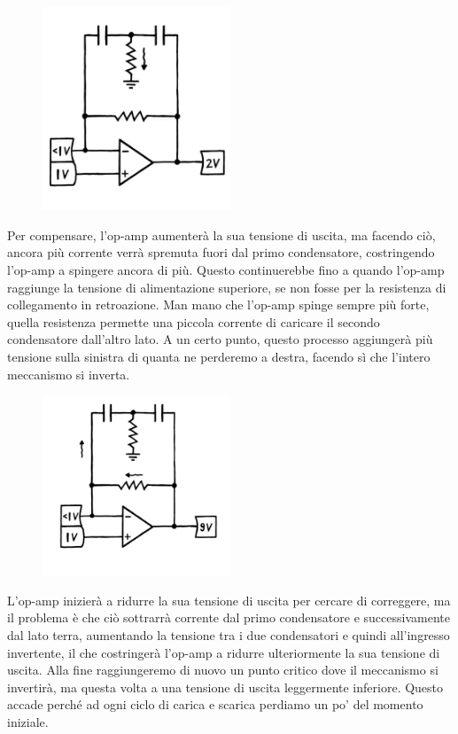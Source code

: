 \documentclass{article}
\begin{document}
\begin{figure}[ht]
    \centering
    \includegraphics[width=0.5\textwidth]{Toscillator2.png} 
    \label{fig:Toscillator2}
\end{figure}

Per compensare, l'op-amp aumenterà la sua tensione di uscita, ma facendo ciò, ancora più corrente verrà spremuta fuori dal primo condensatore, costringendo l'op-amp a spingere ancora di più.
Questo continuerebbe fino a quando l'op-amp raggiunge la tensione di alimentazione superiore, se non fosse per la resistenza di collegamento in retroazione.
Man mano che l'op-amp spinge sempre più forte, quella resistenza permette una piccola corrente di caricare il secondo condensatore dall'altro lato.
A un certo punto, questo processo aggiungerà più tensione sulla sinistra di quanta ne perderemo a destra, facendo sì che l'intero meccanismo si inverta.

\begin{figure}[ht]
    \centering
    \includegraphics[width=0.5\textwidth]{Toscillator3.png} 
    \label{fig:Toscillator3}
\end{figure}


L'op-amp inizierà a ridurre la sua tensione di uscita per cercare di correggere, ma il problema è che ciò sottrarrà corrente dal primo condensatore e successivamente dal lato terra, aumentando la tensione tra i due condensatori e quindi all'ingresso invertente, il che costringerà l'op-amp a ridurre ulteriormente la sua tensione di uscita.
Alla fine raggiungeremo di nuovo un punto critico dove il meccanismo si invertirà, ma questa volta a una tensione di uscita leggermente inferiore.
Questo accade perché ad ogni ciclo di carica e scarica perdiamo un po' del momento iniziale. 
\end{document}
